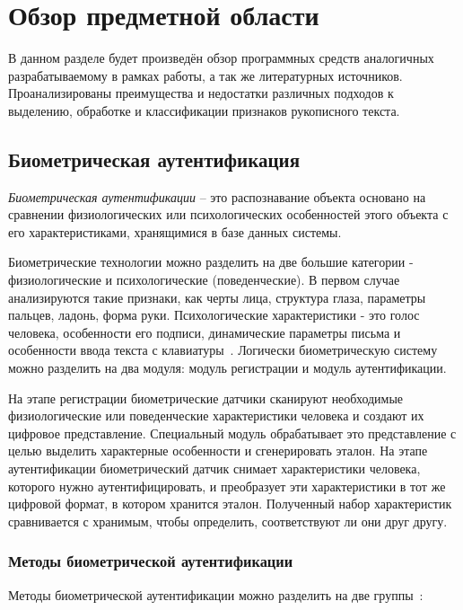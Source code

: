 \section{Обзор предметной области}
\label{sec:domain:intro}

В данном разделе будет произведён обзор программных средств аналогичных разрабатываемому в рамках работы, а так же литературных источников. Проанализированы преимущества и недостатки различных подходов к выделению, обработке и классификации признаков рукописного текста.

\subsection{Биометрическая аутентификация}
\label{sub:domain:bioauthentication}
\emph{Биометрическая аутентификации} -- это распознавание объекта основано на сравнении физиологических или психологических особенностей этого объекта с его характеристиками, хранящимися в
базе данных системы.

Биометрические технологии можно разделить на две большие категории - физиологические и психологические (поведенческие). В первом случае анализируются такие признаки, как черты лица, структура глаза, параметры пальцев, ладонь, форма руки. Психологические характеристики - это голос человека, особенности его подписи, динамические параметры письма и особенности ввода текста с клавиатуры~\cite{bioauth_dinamic_moves}.
Логически биометрическую систему можно разделить на два модуля: модуль регистрации и модуль аутентификации.

На этапе регистрации биометрические датчики сканируют необходимые физиологические или поведенческие характеристики человека и создают их цифровое представление. Специальный модуль обрабатывает это представление с целью выделить характерные особенности и сгенерировать эталон. На этапе аутентификации биометрический датчик снимает характеристики человека, которого нужно аутентифицировать, и преобразует эти характеристики в тот же цифровой формат, в котором хранится эталон. Полученный набор характеристик сравнивается с хранимым, чтобы определить, соответствуют ли они друг другу.

\subsubsection{Методы биометрической аутентификации}
Методы биометрической аутентификации можно разделить на две группы~\cite{wiki_sign_verification}:

